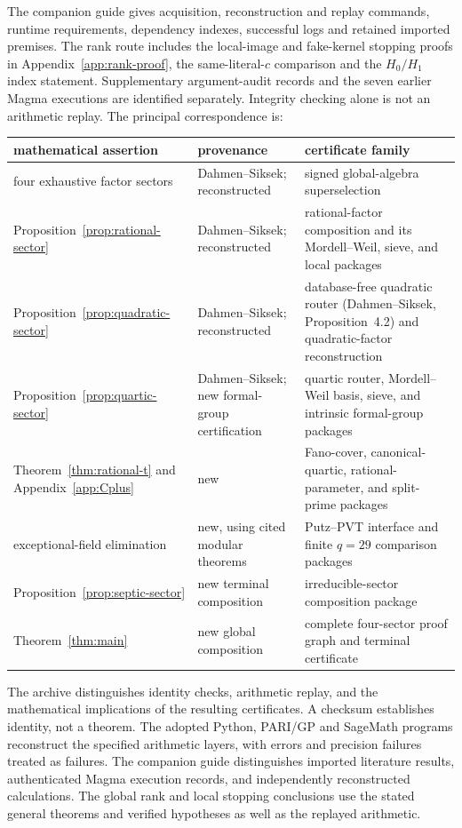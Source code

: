 \documentclass[11pt]{article}
\theoremstyle{definition}
\theoremstyle{remark}
\begin{document}
The companion guide gives acquisition, reconstruction and replay
commands, runtime requirements, dependency indexes, successful logs and
retained imported premises. The rank route includes the local-image
and fake-kernel stopping proofs in Appendix~\ref{app:rank-proof},
the same-literal-$c$ comparison and the $H_0/H_1$ index statement.
Supplementary argument-audit records and the seven earlier Magma
executions are identified separately. Integrity checking alone is not
an arithmetic replay.
The principal correspondence is:
\begin{center}
\begin{tabular}{@{}>{\raggedright\arraybackslash}p{}
                    >{\raggedright\arraybackslash}p{}
                    >{\raggedright\arraybackslash}p{}@{}}
\toprule
mathematical assertion & provenance & certificate family\\
\midrule
four exhaustive factor sectors
  & Dahmen--Siksek; reconstructed
  & signed global-algebra superselection\\
Proposition~\ref{prop:rational-sector}
  & Dahmen--Siksek; reconstructed
  & rational-factor composition and its Mordell--Weil, sieve, and local packages\\
Proposition~\ref{prop:quadratic-sector}
  & Dahmen--Siksek; reconstructed
  & database-free quadratic router (Dahmen--Siksek, Proposition~4.2) and quadratic-factor reconstruction\\
Proposition~\ref{prop:quartic-sector}
  & Dahmen--Siksek; new formal-group certification
  & quartic router, Mordell--Weil basis, sieve, and intrinsic formal-group packages\\
Theorem~\ref{thm:rational-t} and Appendix~\ref{app:Cplus}
  & new
  & Fano-cover, canonical-quartic, rational-parameter, and split-prime packages\\
exceptional-field elimination
  & new, using cited modular theorems
  & Putz--PVT interface and finite $q=29$ comparison packages\\
Proposition~\ref{prop:septic-sector}
  & new terminal composition
  & irreducible-sector composition package\\
Theorem~\ref{thm:main}
  & new global composition
  & complete four-sector proof graph and terminal certificate\\
\bottomrule
\end{tabular}
\end{center}
The archive distinguishes identity checks, arithmetic replay, and the
mathematical implications of the resulting certificates.  A checksum
establishes identity, not a theorem.  The adopted Python, PARI/GP and
SageMath programs reconstruct the specified arithmetic layers, with errors
and precision failures treated as failures.  The companion guide
distinguishes imported literature results, authenticated Magma execution
records, and independently reconstructed calculations.
The global rank and local stopping conclusions use the stated general
theorems and verified hypotheses as well as the replayed arithmetic.
\end{document}
